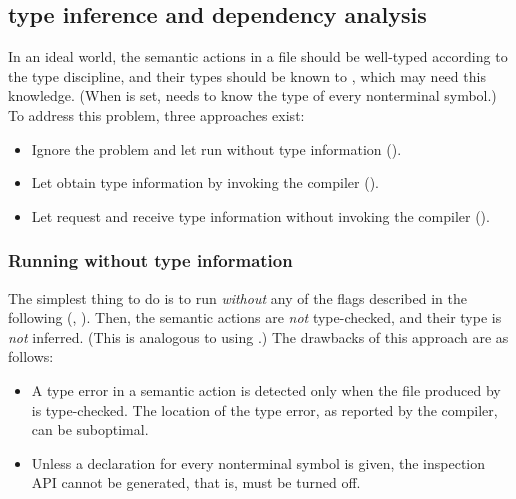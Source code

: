 \documentclass[onecolumn,11pt,nocopyrightspace,preprint]{sigplanconf}
\begin{document}
\subsection{\ocaml type inference and dependency analysis}
\label{sec:build:infer}

In an ideal world, the semantic actions in a \mly file should be well-typed
according to the \ocaml type discipline, and their types should be known to
\menhir, which may need this knowledge. (When \oinspection is set, \menhir
needs to know the \ocaml type of every nonterminal symbol.)
%
To address this problem, three approaches exist:
\begin{itemize}
\item Ignore the problem and let \menhir run without \ocaml type information
      ().
\item Let \menhir obtain \ocaml type information
      by invoking the \ocaml compiler
      ().
\item Let \menhir request and receive \ocaml type information
      without invoking the \ocaml compiler
      ().
\end{itemize}

\subsubsection{Running without \ocaml type information}
\label{sec:build:infer:none}

The simplest thing to do is to run \menhir \emph{without} any of the flags
described in the following (,
).
%
Then, the semantic actions are \emph{not} type-checked,
and their \ocaml type is \emph{not} inferred.
%
(This is analogous to using \ocamlyacc.)
%
The drawbacks of this approach are as follows:
\begin{itemize}
\item A type error in a semantic action is detected only when the \ml
      file produced by \menhir is type-checked. The location of the
      type error, as reported by the \ocaml compiler, can be
      suboptimal.
\item Unless a \dtype declaration for every nonterminal symbol is
      given, the inspection API cannot be generated, that is,
      \oinspection must be turned off.
\end{itemize}
\end{document}

